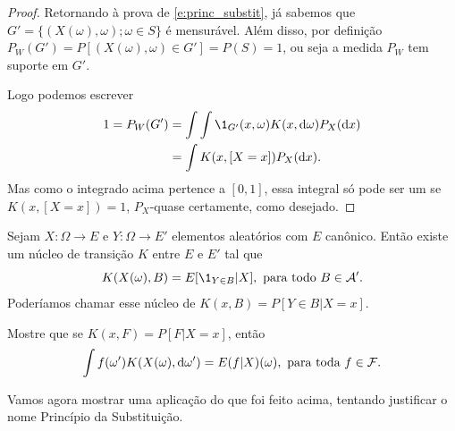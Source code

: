 \begin{proof}
  Retornando à prova de \eqref{e:princ_substit}, já sabemos que $G' = \{(X(\omega), \omega); \omega \in S\}$ é mensurável.
  Além disso, por definição $P_W(G') = P[(X(\omega), \omega) \in G'] = P(S) = 1$, ou seja a medida $P_W$ tem suporte em $G'$.

  Logo podemos escrever
  \begin{equation}
    \begin{split}
      1 = P_W(G') & = \int \int \1_{G'} (x, \omega) K(x, \d \omega)  P_X (\d x)\\
      & = \int K(x, [X = x]) P_X (\d x).
    \end{split}
  \end{equation}
  Mas como o integrado acima pertence a $[0,1]$, essa integral só pode ser um se $K(x, [X = x]) = 1$, $P_X$-quase certamente, como desejado.
\end{proof}

\begin{exercise}
  Sejam $X: \Omega \to E$ e $Y: \Omega \to E'$ elementos aleatórios com $E$ canônico.
  Então existe um núcleo de transição $K$ entre $E$ e $E'$ tal que
  \begin{equation}
    \label{e:regular_cond_prob_givenX}
    K(X(\omega), B) = E[\1_{Y \in B} | X], \text{ para todo $B \in \mathcal{A}'$}.
  \end{equation}
  Poderíamos chamar esse núcleo de $K(x, B) = P[Y \in B | X = x]$.
\end{exercise}

\begin{exercise}
  Mostre que se $K(x, F) = P[F| X = x]$, então
  \begin{equation}
    \label{e:reg_cond_exp_givenX}
    \int f(\omega') K(X(\omega), \mathop{}\!\mathrm{d} \omega') = E(f | X)(\omega), \text{ para toda $f \in \mathcal{F}$}.
  \end{equation}
\end{exercise}


Vamos agora mostrar uma aplicação do que foi feito acima, tentando justificar o nome Princípio da Substituição.

